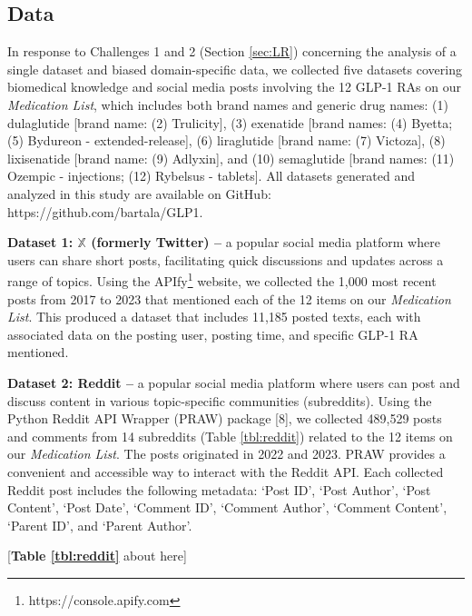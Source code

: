 \documentclass[referee,bst/sn-basic]{sn-jnl}%
\begin{document}
\subsection{Data}
\label{sect:data}
In response to Challenges 1 and 2 (Section \ref{sec:LR}) concerning the analysis of a single dataset and biased domain-specific data, we collected five datasets covering biomedical knowledge and social media posts involving the 12 GLP-1 RAs on our  \textit{Medication List}, which includes both brand names and generic drug names:
    (1) dulaglutide [brand name: (2) Trulicity],
    (3) exenatide [brand names: (4) Byetta; (5) Bydureon - extended-release],
    (6) liraglutide [brand name: (7) Victoza], 
    (8) lixisenatide [brand name: (9) Adlyxin], and
   (10) semaglutide [brand names: (11) Ozempic - injections; (12) Rybelsus - tablets].
All datasets generated and analyzed in this study are available on GitHub: https://github.com/bartala/GLP1.%

\textbf{Dataset 1: $\mathbb{X}$ (formerly Twitter) --}
a popular social media platform where users can share short posts, facilitating quick discussions and updates across a range of topics.
Using the APIfy\footnote{https://console.apify.com} website, we collected the 1,000 most recent posts from 2017 to 2023 that mentioned each of the 12 items on our \textit{Medication List}.
This produced a dataset that includes 11,185 posted texts, %
each with associated data on the posting user, posting time, and specific GLP-1 RA mentioned.

\textbf{Dataset 2: Reddit --}
a popular social media platform where users can post and discuss content in various topic-specific communities (subreddits).
Using the Python Reddit API Wrapper (PRAW) package [8], 
we collected 489,529 posts and comments from 14 subreddits (Table \ref{tbl:reddit}) related to the 12 items on our \textit{Medication List}.
The posts originated in 2022 and 2023.
PRAW provides a convenient and accessible way to interact with the Reddit API.
Each collected Reddit post includes the following metadata:
    `Post ID',
    `Post Author',
    `Post Content',
    `Post Date',
    `Comment ID',
    `Comment Author',
    `Comment Content',
    `Parent ID', and
    `Parent Author'.

\begin{center}
[\textbf{Table \ref{tbl:reddit}} about here] 
\end{center}
\end{document}
